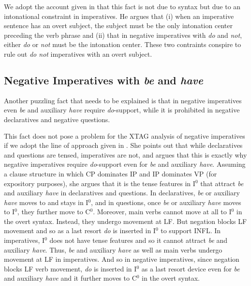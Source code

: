 {{\beginsentences
{}\label{ex:308} 
\label{ex:309} 
\endsentences

 
We adopt the account given in \cite{akmajian84} that this fact is not due 
to syntax but due to an intonational constraint in imperatives.  He argues 
that (i) when an imperative sentence has an overt subject, the subject must be 
the only intonation center preceding the verb phrase and (ii) that in 
negative imperatives with {\it do} and {\it not}, either {\it do} or {\it not} must be the intonation center.  These two contraints conspire to rule 
out {\it do not} imperatives with an overt subject. 
 
\subsection{Negative Imperatives with {\it be} and {\it have}} 
 
Another puzzling fact that needs to be explained  is that in negative 
imperatives even {\it be} and auxiliary {\it have} require {\it do}-support, while it is prohibited in negative declaratives and negative 
questions.  
 
\beginsentences
{}\label{ex:310} 
\label{ex:311} 
\endsentences

 
\beginsentences
{}\label{ex:312} 
\label{ex:313} 
\endsentences

 
This fact does not pose a problem for the XTAG analysis of negative 
imperatives if we adopt the line of approach given in \cite{handiss}.  She 
points out that while declaratives and questions are tensed, imperatives 
are not, and argues that this is exactly why negative imperatives require 
{\it do}-support even for {\it be} and auxiliary {\it have}.  Assuming a 
clause structure in which CP dominates IP and IP dominates VP (for 
expository purposes), she argues that it is the tense features in I$^0$ 
that attract {\it be} and auxiliary {\it have} in declaratives and 
questions.  In declaratives, {\it be} or auxiliary {\it have} moves to and 
stays in I$^0$, and in questions, once {\it be} or auxiliary {\it have} 
moves to I$^0$, they further move to C$^0$.  Moreover, main verbs cannot 
move at all to I$^0$ in the overt syntax.  Instead, they undergo movement 
at LF.  But negation blocks LF movement and so as a last resort {\it do} is 
inserted in I$^0$ to support INFL.  In imperatives, I$^0$ does not have 
tense features and so it cannot attract {\it be} and auxiliary {\it have}. 
Thus, {\it be} and auxiliary {\it have} as well as main verbs undergo 
movement at LF in imperatives.  And so in negative imperatives, since 
negation blocks LF verb movement, {\it do} is inserted in I$^0$ as a last 
resort device even for {\it be} and auxiliary {\it have} and it further 
moves to C$^0$ in the overt syntax. 
 
}}
